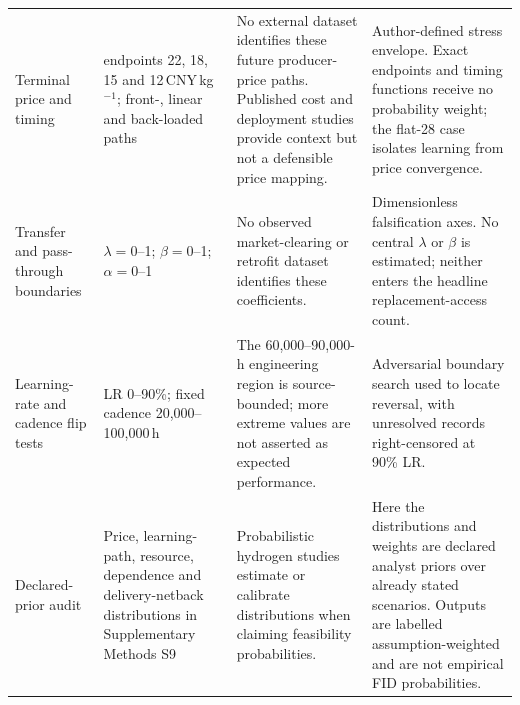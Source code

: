 \documentclass[pdflatex,sn-nature]{sn-jnl}
\begin{document}
\begin{longtable}{>{\raggedright\arraybackslash}p{}>{\raggedright\arraybackslash}p{}>{\raggedright\arraybackslash}p{}>{\raggedright\arraybackslash}p{}}
Terminal price and timing & 2060 endpoints 22, 18, 15 and 12\,CNY\,kg$^{-1}$; front-, linear and back-loaded paths & No external dataset identifies these future producer-price paths. Published cost and deployment studies provide context but not a defensible price mapping\cite{glenk2023,iea2025}. & Author-defined stress envelope. Exact endpoints and timing functions receive no probability weight; the flat-28 case isolates learning from price convergence. \\
Transfer and pass-through boundaries & $\lambda=0$--1; $\beta=0$--1; $\alpha=0$--1 & No observed market-clearing or retrofit dataset identifies these coefficients. & Dimensionless falsification axes. No central $\lambda$ or $\beta$ is estimated; neither enters the headline replacement-access count. \\
Learning-rate and cadence flip tests & LR 0--90\%; fixed cadence 20,000--100,000\,h & The 60,000--90,000-h engineering region is source-bounded\cite{doe2024,worldbank2026}; more extreme values are not asserted as expected performance. & Adversarial boundary search used to locate reversal, with unresolved records right-censored at 90\% LR. \\
Declared-prior audit & Price, learning-path, resource, dependence and delivery-netback distributions in Supplementary Methods S9 & Probabilistic hydrogen studies estimate or calibrate distributions when claiming feasibility probabilities\cite{odenweller2022}. & Here the distributions and weights are declared analyst priors over already stated scenarios. Outputs are labelled assumption-weighted and are not empirical FID probabilities. \\
\end{longtable}
\endgroup
\end{document}
